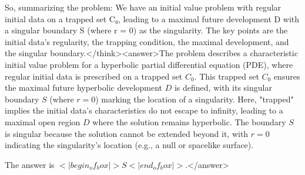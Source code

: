 So, summarizing the problem: We have an initial value problem with regular initial data on a trapped set C₀, leading to a maximal future development D with a singular boundary S (where r = 0) as the singularity. The key points are the initial data's regularity, the trapping condition, the maximal development, and the singular boundary.</think><answer>The problem describes a characteristic initial value problem for a hyperbolic partial differential equation (PDE), where regular initial data is prescribed on a trapped set \( C_0 \). This trapped set \( C_0 \) ensures the maximal future hyperbolic development \( D \) is defined, with its singular boundary \( S \) (where \( r = 0 \)) marking the location of a singularity. Here, "trapped" implies the initial data's characteristics do not escape to infinity, leading to a maximal open region \( D \) where the solution remains hyperbolic. The boundary \( S \) is singular because the solution cannot be extended beyond it, with \( r = 0 \) indicating the singularity's location (e.g., a null or spacelike surface).  

The answer is \(<|begin_of_box|>S<|end_of_box|>\).</answer>